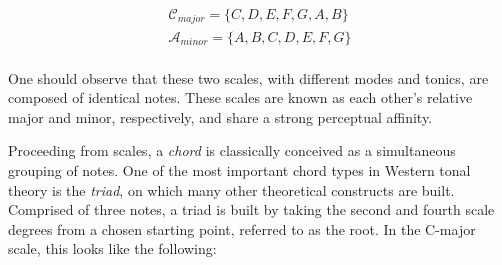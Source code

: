 \begin{align*}
\mathcal{C}_{major} = \{C, D, E, F, G, A, B\} \\
\mathcal{A}_{minor} = \{A, B, C, D, E, F, G\} \\
\end{align*}

One should observe that these two scales, with different modes and tonics, are composed of identical notes.
These scales are known as each other's relative major and minor, respectively, and share a strong perceptual affinity.



Proceeding from scales, a \emph{chord} is classically conceived as a simultaneous grouping of notes.
One of the most important chord types in Western tonal theory is the \emph{triad}, on which many other theoretical constructs are built.
Comprised of three notes, a triad is built by taking the second and fourth scale degrees from a chosen starting point, referred to as the root.
In the C-major scale, this looks like the following:


